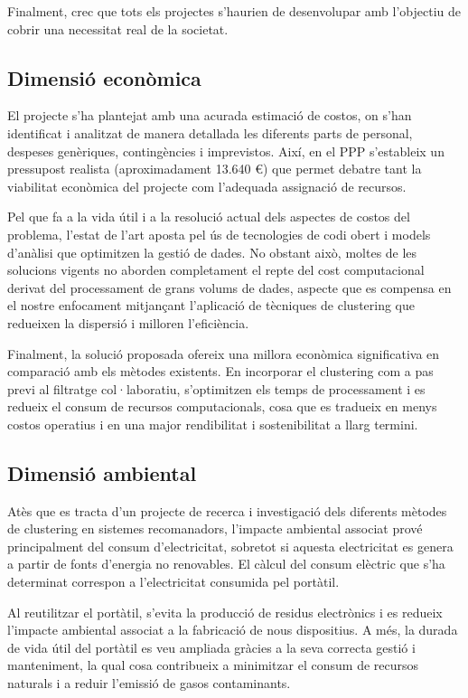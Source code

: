 \documentclass[a4paper,12pt]{report}
\begin{document}
Finalment, crec que tots els projectes s'haurien de desenvolupar amb l'objectiu de cobrir una necessitat real de la societat.

\subsection{Dimensió econòmica}

El projecte s'ha plantejat amb una acurada estimació de costos, on s'han identificat i analitzat de manera detallada les diferents parts de personal, despeses genèriques, contingències i imprevistos. Així, en el PPP s'estableix un pressupost realista (aproximadament 13.640 €) que permet debatre tant la viabilitat econòmica del projecte com l'adequada assignació de recursos.

Pel que fa a la vida útil i a la resolució actual dels aspectes de costos del problema, l’estat de l’art aposta pel ús de tecnologies de codi obert i models d’anàlisi que optimitzen la gestió de dades. No obstant això, moltes de les solucions vigents no aborden completament el repte del cost computacional derivat del processament de grans volums de dades, aspecte que es compensa en el nostre enfocament mitjançant l’aplicació de tècniques de clustering que redueixen la dispersió i milloren l’eficiència.

Finalment, la solució proposada ofereix una millora econòmica significativa en comparació amb els mètodes existents. En incorporar el clustering com a pas previ al filtratge col·laboratiu, s’optimitzen els temps de processament i es redueix el consum de recursos computacionals, cosa que es tradueix en menys costos operatius i en una major rendibilitat i sostenibilitat a llarg termini.

\subsection{Dimensió ambiental}

Atès que es tracta d’un projecte de recerca i investigació dels diferents mètodes de clustering en sistemes recomanadors, l’impacte ambiental associat prové principalment del consum d’electricitat, sobretot si aquesta electricitat es genera a partir de fonts d’energia no renovables. El càlcul del consum elèctric que s'ha determinat correspon a l’electricitat consumida pel portàtil.

Al reutilitzar el portàtil, s’evita la producció de residus electrònics i es redueix l’impacte ambiental associat a la fabricació de nous dispositius. A més, la durada de vida útil del portàtil es veu ampliada gràcies a la seva correcta gestió i manteniment, la qual cosa contribueix a minimitzar el consum de recursos naturals i a reduir l’emissió de gasos contaminants.
\end{document}
